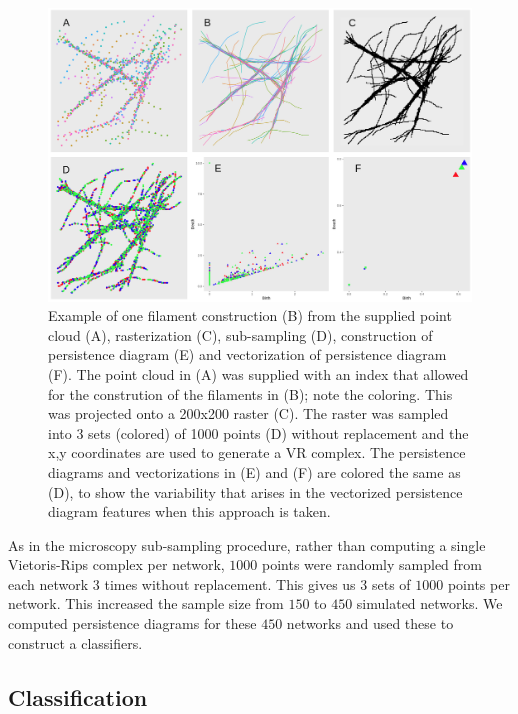 \documentclass[10pt]{article}
\begin{document}
\begin{figure}[H]
	\begin{center}
		\includegraphics[width=1\textwidth]{figures/resample_algo.png}
	\end{center}
	\caption{Example of one filament construction (B) from the supplied point cloud (A), rasterization (C), sub-sampling (D), construction of persistence diagram (E) and vectorization of persistence diagram (F). The point cloud in (A) was supplied with an index that allowed for the constrution of the filaments in (B); note the coloring. This was projected onto a 200x200 raster (C). The raster was sampled into 3 sets (colored) of 1000 points (D) without replacement and the x,y coordinates are used to generate a VR complex. The persistence diagrams and vectorizations in (E) and (F) are colored the same as (D), to show the variability that arises in the vectorized persistence diagram features when this approach is taken.}
	\label{fig:resample_algorithm}
\end{figure}

As in the microscopy sub-sampling procedure, rather than computing a single Vietoris-Rips complex per network, $1000$ points were randomly sampled from each network $3$ times without replacement. This gives us $3$ sets of $1000$ points per network. This increased the sample size from $150$ to $450$ simulated networks. We computed persistence diagrams for these $450$ networks and used these to construct a classifiers.

\subsection{Classification}\label{sec:classification}
\end{document}
